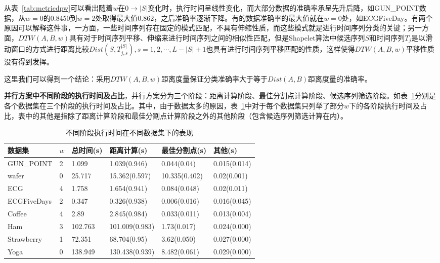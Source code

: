 从表~\ref{tab:metricdpw}可以看出随着$w$在$ 0 \to |S|$变化时，执行时间呈线性变化，而大部分数据的准确率承呈先升后降，如GUN\_POINT数据，从$w=0$的0.8450到$w=2$处取得最大值0.862，之后准确率逐渐下降。有的数据准确率的最大值就在$w=0$处，如ECGFiveDay。有两个原因可以解释这件事，一方面，一些时间序列存在固定的模式匹配，不具有伸缩性质，而这些模式就是进行时间序列分类的关键；另一方面，$DTW(A,B,w)$具有对于时间序列平移、伸缩来进行时间序列之间的相似性匹配，但是Shapelet算法中候选序列$S$和时间序列$T_j$是以滑动窗口的方式进行距离比较$Dist(S,T_{j,s}^{|S|}),s=1,2,\cdots,L-|S|+1$也具有进行时间序列平移匹配的性质，这样使得$DTW(A,B,w)$平移性质没有得到发挥。

这里我们可以得到一个结论：采用$DTW(A,B,w)$距离度量保证分类准确率大于等于$Dist(A,B)$距离度量的准确率。

\textbf{并行方案中不同阶段的执行时间及占比}，并行方案分为三个阶段：距离计算阶段、最佳分割点计算阶段、候选序列筛选阶段。如表~\ref{tab:OverviewTime}分别是各个数据集在三个阶段的执行时间及占比。其中，由于数据太多的原因，表~\ref{tab:OverviewTime}中对于每个数据集只列举了部分$w$下的各阶段执行时间及占比，表中的其他是指除了距离计算阶段和最佳分割点计算阶段之外的其他阶段（包含候选序列筛选计算在内）。

\begin{table}[htbp]
	\centering
	\begin{minipage}{0.9\textwidth}
		\caption{不同阶段执行时间在不同数据集下的表现}
		\label{tab:OverviewTime}
		\begin{tabular}{p{2cm}p{1cm}p{2cm}p{2cm}p{2.5cm}p{2cm}}
			\toprule[1.5pt]
			{\heiti 数据集} &{\heiti $w$ } &{\heiti 总时间(s) } &{\heiti 距离计算(s) } &{\heiti 最佳分割点(s) } &{\heiti 其他(s) }
			\\\midrule[1pt]
			GUN\_POINT & 2 & 1.099 & 1.039(0.946) & 0.044(0.04) & 0.015(0.014)\\
			wafer & 0 & 25.717 & 15.362(0.597) & 10.335(0.402) & 0.02(0.001)\\
			ECG & 4 & 1.758 & 1.654(0.941) & 0.084(0.048) & 0.02(0.011)\\
			ECGFiveDays & 2 & 0.347 & 0.326(0.938) & 0.006(0.016) & 0.016(0.045)\\
			Coffee & 4 & 2.89 & 2.845(0.984) & 0.033(0.011) & 0.013(0.004)\\
			Ham & 3 & 102.763 & 101.009(0.983) & 1.73(0.017) & 0.024(0.000)\\
			Strawberry & 1 & 72.351 & 68.704(0.95) & 3.62(0.050) & 0.027(0.000)\\
			Yoga & 0 & 138.949 & 130.438(0.939) & 8.482(0.061) & 0.029(0.000)\\
			\bottomrule[1.5pt]
		\end{tabular}
	\end{minipage}
\end{table}

